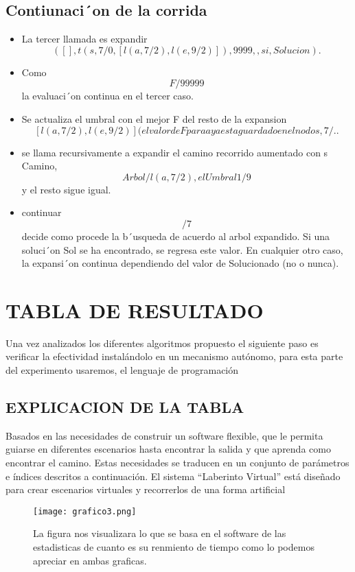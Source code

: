 \documentclass[letterpaper, 10 pt, conference]{ieeeconf}  %
\begin{document}
\subsection{Contiunaci´on de la corrida}
\begin{itemize}


\item La tercer llamada es expandir $$([],t(s, 7/0, [l(a, 7/2), l(e, 9/2)]), 9999,, si, Solucion).$$
\item Como $$ F/9  9999 $$ la evaluaci´on continua en el tercer caso.
\item Se actualiza el umbral con el mejor F del resto de la expansion$$ [l(a, 7/2), l(e, 9/2)] (el valor de F para a ya esta guardado en el nodo s, 7/.. $$
\item se llama recursivamente a expandir el camino recorrido aumentado con s Camino,$$  Arbol/l(a, 7/2), el Umbral1/9 $$ y el resto sigue igual.
\item continuar $$/7 $$ decide como procede la b´usqueda de acuerdo al arbol expandido. Si una soluci´on Sol se ha encontrado, se regresa este valor. En cualquier otro caso, la expansi´on continua dependiendo del valor de Solucionado (no o nunca).


\end{itemize}


\section{TABLA DE RESULTADO}

Una vez analizados los diferentes algoritmos propuesto el siguiente paso es verificar la
efectividad instalándolo en un mecanismo autónomo, para esta parte del experimento
usaremos, el lenguaje de programación 

\subsection{EXPLICACION DE LA TABLA}

Basados en las necesidades de construir un software flexible, que le permita guiarse en
diferentes escenarios hasta encontrar la salida y que aprenda como encontrar el camino.
Estas necesidades se traducen en un conjunto de parámetros e índices descritos a
continuación. El sistema  “Laberinto Virtual” está diseñado para crear escenarios virtuales y recorrerlos de una
forma artificial 


\begin{figure}[bh] 
\centerline{\texttt{[image: grafico3.png]}} %
\vspace*{8pt}
\caption{La figura nos visualizara lo que se basa en el software de las estadisticas de cuanto es su renmiento de tiempo como lo podemos apreciar en ambas graficas.}
\end{figure}
\end{document}
